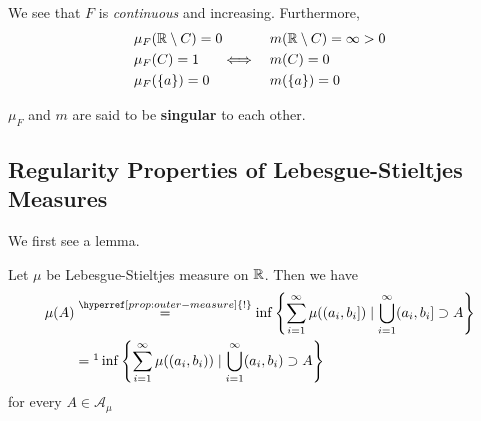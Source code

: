 We see that \(F\) is \emph{continuous} and increasing. Furthermore,
\[
	\begin{alignedat}{3}
		&\mu _F(\mathbb{\MakeUppercase{r}} \setminus C) = 0 &\qquad &m(\mathbb{\MakeUppercase{r}} \setminus C)=\infty >0\\
		&\mu _F(C) = 1 & \iff\quad &m(C) = 0\\
		&\mu _F(\{a\}) = 0 & &m(\{a\})=0
	\end{alignedat}
\]
\begin{remark}
	\(\mu _F\) and \(m\) are said to be \textbf{singular} to each other.
\end{remark}

\subsection{Regularity Properties of Lebesgue-Stieltjes Measures}
We first see a lemma.
\begin{lemma}
	Let \(\mu\) be Lebesgue-Stieltjes measure on \(\mathbb{\MakeUppercase{r}} \). Then we have
	\[
		\begin{split}
			\mu (A) &\overset{\hyperref[prop:outer-measure]{!}}{=}\inf\left\{\sum\limits_{i=1}^{\infty} \mu ((a_{i}, b_{i}]) \mid \bigcup\limits_{i=1}^{\infty} (a_{i}, b_{i}]\supset A\right\}\\
			&=\footnotemark\inf\left\{\sum\limits_{i=1}^{\infty} \mu ((a_{i}, b_{i})) \mid \bigcup\limits_{i=1}^{\infty} (a_{i}, b_{i})\supset A\right\}
		\end{split}
	\]
	for every \(A\in \mathcal{A} _\mu \)
\end{lemma}

